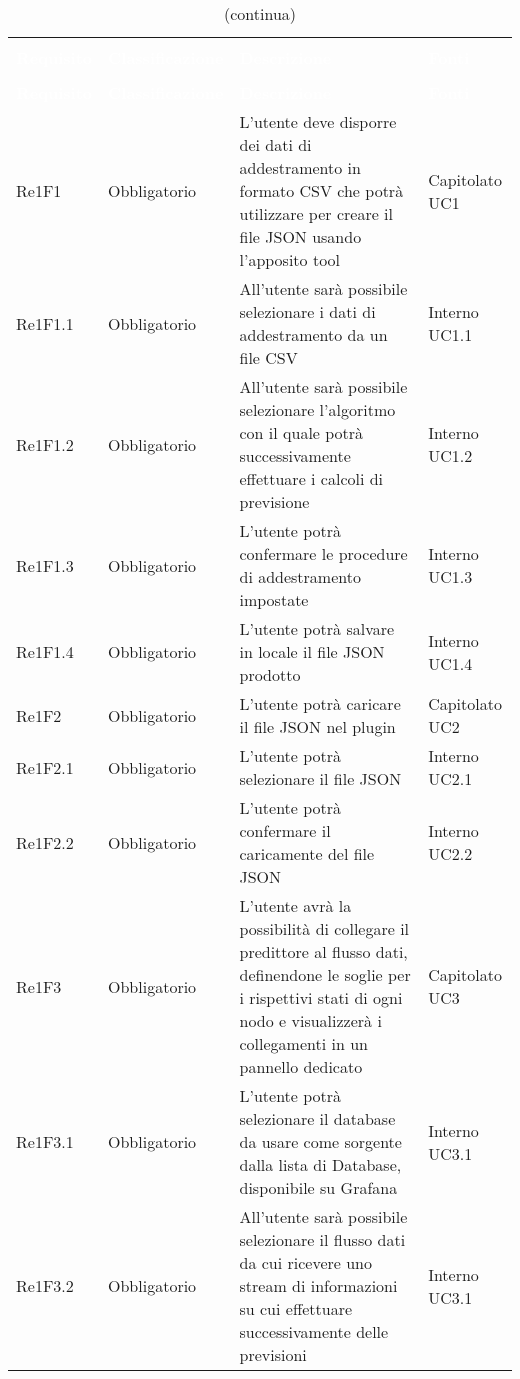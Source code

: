 \begin{longtable}{C{3cm} C{3cm} L{5.5cm} C{3cm}}
\caption{Tabella dei requisiti funzionali} \\
\textcolor{white}{\textbf{Requisito}} &
\textcolor{white}{\textbf{Classificazione}} &
\textcolor{white}{\textbf{Descrizione}} &
\textcolor{white}{\textbf{Fonti}}  \\
		\endfirsthead
		\caption[]{(continua)} \\
\textcolor{white}{\textbf{Requisito}} &
\textcolor{white}{\textbf{Classificazione}} &
\textcolor{white}{\textbf{Descrizione}} &
\textcolor{white}{\textbf{Fonti}}  \\
		\endhead
Re1F1 & Obbligatorio & L’utente deve disporre dei dati di addestramento in formato CSV che potrà utilizzare  per creare il file JSON usando l’apposito tool & Capitolato UC1\\
Re1F1.1 & Obbligatorio & All’utente sarà possibile selezionare i dati di addestramento da un file CSV &  Interno UC1.1\\
Re1F1.2 & Obbligatorio & All’utente sarà possibile selezionare l’algoritmo con il quale potrà successivamente effettuare i calcoli di previsione &  Interno UC1.2\\
Re1F1.3 & Obbligatorio & L’utente potrà confermare le procedure di addestramento impostate &  Interno UC1.3\\
Re1F1.4 & Obbligatorio & L’utente potrà salvare in locale il file JSON prodotto & Interno UC1.4\\
Re1F2 & Obbligatorio & L’utente potrà caricare il file JSON nel plugin & Capitolato UC2\\
Re1F2.1 & Obbligatorio & L’utente potrà selezionare il file JSON &  Interno UC2.1\\
Re1F2.2 & Obbligatorio & L’utente potrà confermare il caricamente del file JSON &  Interno UC2.2\\
Re1F3 & Obbligatorio & L’utente avrà la possibilità di collegare il predittore al flusso dati, definendone le soglie per i rispettivi stati di ogni nodo e visualizzerà i collegamenti in un
pannello dedicato
 &  Capitolato UC3\\
Re1F3.1 & Obbligatorio & L’utente potrà selezionare il database da usare come sorgente dalla lista di Database, disponibile su Grafana &  Interno UC3.1\\
Re1F3.2 & Obbligatorio & All’utente sarà possibile selezionare il flusso dati da cui ricevere uno stream di informazioni su cui effettuare successivamente delle previsioni &  Interno UC3.1\\

\end{longtable}
